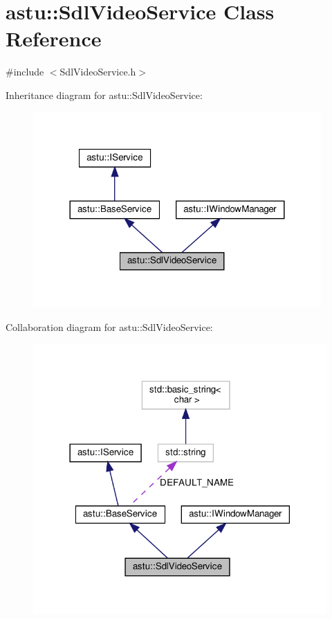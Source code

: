 \hypertarget{classastu_1_1SdlVideoService}{}\section{astu\+:\+:Sdl\+Video\+Service Class Reference}
\label{classastu_1_1SdlVideoService}


{\ttfamily \#include $<$Sdl\+Video\+Service.\+h$>$}



Inheritance diagram for astu\+:\+:Sdl\+Video\+Service\+:\nopagebreak
\begin{figure}[H]
\begin{center}
\leavevmode
\includegraphics[width=312pt]{classastu_1_1SdlVideoService__inherit__graph}
\end{center}
\end{figure}


Collaboration diagram for astu\+:\+:Sdl\+Video\+Service\+:\nopagebreak
\begin{figure}[H]
\begin{center}
\leavevmode
\includegraphics[width=318pt]{classastu_1_1SdlVideoService__coll__graph}
\end{center}
\end{figure}
